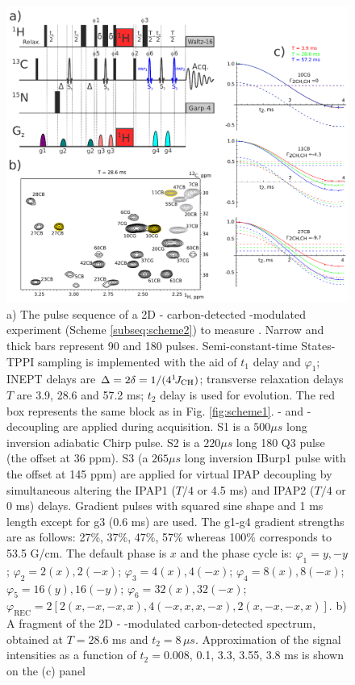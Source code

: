 \documentclass[twocolumn]{svjour3}           %
\begin{document}
\begin{figure}
  \includegraphics[width=1.0\textwidth]{Fig2}
  \caption{
  a) The pulse sequence of a 2D \hlab-\clab{} carbon-detected 
  \oneJch-modulated experiment (Scheme \ref{subseq:scheme2}) to measure 
  \gtwoCH. 
  Narrow and thick bars represent 90\degree{} and 180\degree{} pulses.
  Semi-constant-time \hlab{} States-{TPPI} sampling is implemented 
  with the aid of $t_1$ delay and $\varphi_1$; 
  {INEPT} delays are $\Delta = 2\delta = 1/(4 ^1\!J_\text{CH})$; 
  transverse relaxation delays $T$ are 3.9, 28.6 and 57.2 ms; 
  $t_2$ delay is used for \oneJch{} evolution. 
  The red box represents the same block as in Fig. \ref{fig:scheme1}. 
  \nlab- and \hlab-decoupling are applied during acquisition. 
  S1 is a $500 \mu s$ long \clab{} inversion adiabatic Chirp pulse. 
  S2 is a $220 \mu s$ long 180\degree{} Q3 pulse (the offset at 36 ppm). 
  S3 (a $265 \mu s$ long inversion IBurp1 pulse with the offset at 145 ppm) 
  are applied for virtual {IPAP} decoupling by simultaneous altering the 
  {IPAP1} ($T/4$ or 4.5 ms) and {IPAP2} ($T/4$ or 0 ms) delays. 
  Gradient pulses with squared sine shape and 1 ms length except for g3 
  (0.6 ms) are used. The g1-g4 gradient strengths are as follows: 
  27\%, 37\%, 47\%, 57\% whereas 100\% corresponds to 53.5 G/cm. 
  The default phase is $x$ and the phase cycle is: 
  $\varphi_1 = y, -y$; 
  $\varphi_2 = 2(x), 2(-x)$; 
  $\varphi_3 = 4(x), 4(-x)$; 
  $\varphi_4 = 8(x), 8(-x)$; 
  $\varphi_5 = 16(y), 16(-y)$; 
  $\varphi_6 = 32(x), 32(-x)$; 
  $\varphi_\text{REC} = 2[2(x, -x, -x, x), 4(-x, x, x, -x), 2(x, -x, -x, x)]$. 
  b) A fragment of the 2D \hlab-\clab{} \oneJch-modulated 
  carbon-detected   spectrum, obtained at $T = 28.6$ ms and 
  $t_2 = 8\,\mu s$. 
  Approximation of the signal intensities as a function of $t_2 = 0.008$, 
  0.1, 3.3, 3.55, 3.8 ms is shown on the (c) panel
  }
  \label{fig:scheme2}
\end{figure}
\end{document}
